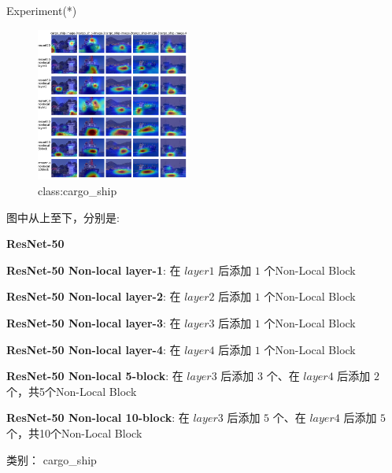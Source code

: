 \begin{frame}{Experiment(*)}
    \begin{multicols}{2}
    \begin{figure}
        \centering
        \includegraphics[width=0.45\textwidth]{docs/paperReading/Non-local/exp/cargo_ship.png}
        \caption{class:cargo_ship}
    \end{figure}

    \begin{scriptsize}
        图中从上至下，分别是:

        \begin{tiny}
            \textbf{ResNet-50}

            \textbf{ResNet-50 Non-local layer-1}: 在 $layer1$ 后添加 $1$ 个Non-Local Block

            \textbf{ResNet-50 Non-local layer-2}: 在 $layer2$ 后添加 $1$ 个Non-Local Block

            \textbf{ResNet-50 Non-local layer-3}: 在 $layer3$ 后添加 $1$ 个Non-Local Block
            
            \textbf{ResNet-50 Non-local layer-4}: 在 $layer4$ 后添加 $1$ 个Non-Local Block
            
            \textbf{ResNet-50 Non-local 5-block}: 在 $layer3$ 后添加 $3$ 个、在 $layer4$ 后添加 $2$ 个，共5个Non-Local Block
            
            \textbf{ResNet-50 Non-local 10-block}: 在 $layer3$ 后添加 $5$ 个、在 $layer4$ 后添加 $5$ 个，共10个Non-Local Block
        \end{tiny}

        类别： cargo_ship 
    \end{scriptsize}
\end{multicols}
\end{frame}

